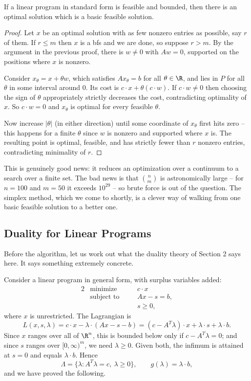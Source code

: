 \begin{theorem}
    If a linear program in standard form is feasible and bounded, then there is an optimal solution which is a basic feasible solution.
\end{theorem}
\begin{proof}
    Let $x$ be an optimal solution with as few nonzero entries as possible, say $r$ of them. If $r \leq m$ then $x$ is a bfs and we are done, so suppose $r > m$. By the argument in the previous proof, there is $w \neq 0$ with $Aw = 0$, supported on the positions where $x$ is nonzero.

    Consider $x_\theta = x + \theta w$, which satisfies $Ax_\theta = b$ for all $\theta \in \R$, and lies in $P$ for all $\theta$ in some interval around $0$. Its cost is $c\cdot x + \theta (c\cdot w)$. If $c\cdot w \neq 0$ then choosing the sign of $\theta$ appropriately strictly decreases the cost, contradicting optimality of $x$. So $c\cdot w = 0$ and $x_\theta$ is optimal for every feasible $\theta$.

    Now increase $|\theta|$ (in either direction) until some coordinate of $x_\theta$ first hits zero -- this happens for a finite $\theta$ since $w$ is nonzero and supported where $x$ is. The resulting point is optimal, feasible, and has strictly fewer than $r$ nonzero entries, contradicting minimality of $r$.
\end{proof}

This is genuinely good news: it reduces an optimization over a continuum to a search over a finite set. The bad news is that $\binom{n}{m}$ is astronomically large -- for $n = 100$ and $m = 50$ it exceeds $10^{29}$ -- so brute force is out of the question. The simplex method, which we come to shortly, is a clever way of walking from one basic feasible solution to a better one.

\subsection{Duality for Linear Programs}

Before the algorithm, let us work out what the duality theory of Section 2 says here. It says something extremely concrete.

Consider a linear program in general form, with surplus variables added:
\begin{alignat*}{2}
    & \text{minimize} \quad && c\cdot x \\
    & \text{subject to} \quad && Ax - s = b, \\
    & && s \geq 0,
\end{alignat*}
where $x$ is unrestricted. The Lagrangian is
$$
L(x, s, \lambda) = c\cdot x - \lambda\cdot(Ax - s - b) = (c - A^T\lambda)\cdot x + \lambda\cdot s + \lambda\cdot b.
$$
Since $x$ ranges over all of $\R^n$, this is bounded below only if $c - A^T\lambda = 0$; and since $s$ ranges over $[0,\infty)^m$, we need $\lambda \geq 0$. Given both, the infimum is attained at $s = 0$ and equals $\lambda\cdot b$. Hence
$$
\Lambda = \{\lambda : A^T\lambda = c,\ \lambda \geq 0\}, \qquad g(\lambda) = \lambda\cdot b,
$$
and we have proved the following.

